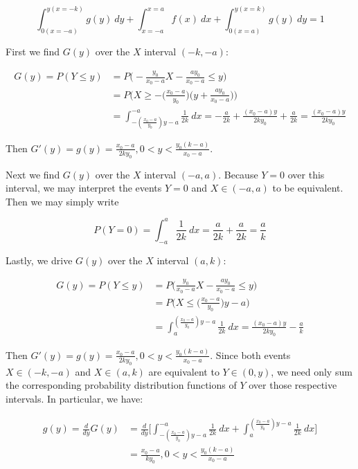 \documentclass[10pt, oneside]{article}
\begin{document}
\begin{enumerate}[label=5.\arabic*]
\begin{enumerate}
	\[ \int^{y (x = -k)}_{0 (x = -a)} g(y) \ dy + \int^{x = a}_{x = -a} f(x) \ dx + \int^{y (x = k)}_{0 (x = a)} g(y) \ dy = 1 \]
	
	First we find $G(y)$ over the $X$ interval $(-k, -a)$:
	
	\begin{align*}
	G(y) = P(Y \leq y) &= P\Big( -\frac{y_0}{x_0 - a} X - \frac{ay_0}{x_0 - a} \leq y \Big) \\
	&= P \Big( X \geq - \Big( \frac{x_0 - a}{y_0} \Big) \Big( y + \frac{ay_0}{x_0 - a} \Big) \Big) \\
	&= \int^{-a}_{-(\frac{x_0 - a}{y_0}) y - a} \frac{1}{2k} \ dx = -\frac{a}{2k} + \frac{(x_0 - a)y}{2ky_0} + \frac{a}{2k} = \frac{(x_0 - a)y}{2ky_0}
	\end{align*}
	
	Then $G'(y) = g(y) = \boxed{\frac{x_0 - a}{2ky_0}, 0 < y < \frac{y_0 (k - a)}{x_0 - a}}$.
	
	Next we find $G(y)$ over the $X$ interval $(-a, a)$. Because $Y = 0$ over this interval, we may interpret the events $Y = 0$ and $X \in (-a,a)$ to be equivalent. Then we may simply write
	
	\[ P(Y = 0) = \int^a_{-a} \frac{1}{2k} \ dx = \frac{a}{2k} + \frac{a}{2k} = \boxed{\frac{a}{k}} \]
	
	Lastly, we drive $G(y)$ over the $X$ interval $(a, k)$:
	
	\begin{align*}
	G(y) = P(Y \leq y) &= P \Big(\frac{y_0}{x_0 - a} X - \frac{ay_0}{x_0 - a} \leq y \Big) \\
	&= P\Big(X \leq \Big( \frac{x_0 - a}{y_0} \Big) y - a \Big) \\
	&=  \int^{(\frac{x_0 - a}{y_0}) y - a}_a \frac{1}{2k} \ dx = \frac{(x_0 - a) y}{2ky_0} - \frac{a}{k}
	\end{align*}
	
	Then $G'(y) = g(y) = \boxed{ \frac{x_0 - a}{2ky_0} , 0 < y < \frac{y_0 (k - a)}{x_0 - a}}$. Since both events $X \in (-k, -a)$ and $X \in (a, k)$ are equivalent to $Y \in (0, y)$, we need only sum the corresponding probability distribution functions of $Y$ over those respective intervals. In particular, we have:
	
	\begin{align*}
	g(y) = \frac{d}{dy}G(y) &= \frac{d}{dy} \Bigg[ \int^{-a}_{-(\frac{x_0 - a}{y_0}) y - a} \frac{1}{2k} \ dx +  \int^{(\frac{x_0 - a}{y_0}) y - a}_a \frac{1}{2k} \ dx \Bigg] \\
	&= \frac{x_0 - a}{ky_0}, 0 < y < \frac{y_0 (k - a)}{x_0 - a}
	\end{align*}
	

\end{enumerate}
\end{enumerate}
\end{document}
